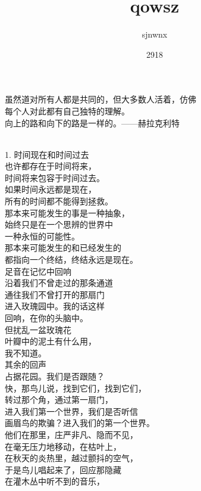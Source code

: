 \documentclass{article}
\title{qowsz}
\author{sjnwnx}
\date{2918}
\begin{document}

\maketitle

\setlength\parindent{0pt}


\Large

﻿虽然道对所有人都是共同的，但大多数人活着，仿佛\\
每个人对此都有自己独特的理解。\\
向上的路和向下的路是一样的。——赫拉克利特 \par 
\\
1. 时间现在和时间过去\\
也许都存在于时间将来，\\
时间将来包容于时间过去。\\
如果时间永远都是现在，\\
所有的时间都不能得到拯救。\\
那本来可能发生的事是一种抽象，\\
始终只是在一个思辨的世界中\\
一种永恒的可能性。\\
那本来可能发生的和已经发生的\\
都指向一个终结，终结永远是现在。
\newpage
\\
足音在记忆中回响\\
沿着我们不曾走过的那条通道\\
通往我们不曾打开的那扇门\\
进入玫瑰园中。我的话这样\\
回响，在你的头脑中。\\
但扰乱一盆玫瑰花\\
叶瓣中的泥土有什么用，\\
我不知道。\\
其余的回声\\
占据花园。我们是否跟随？\\
快，那鸟儿说，找到它们，找到它们，\\
转过那个角，通过第一扇门，\\
进入我们第一个世界，我们是否听信\\
画眉鸟的欺骗？进入我们的第一个世界。\\
他们在那里，庄严非凡、隐而不见，\\
在毫无压力地移动，在枯叶上，\\
在秋天的炎热里，越过颤抖的空气，\\
于是鸟儿唱起来了，回应那隐藏\\
在灌木丛中听不到的音乐，\\
\end{document}

